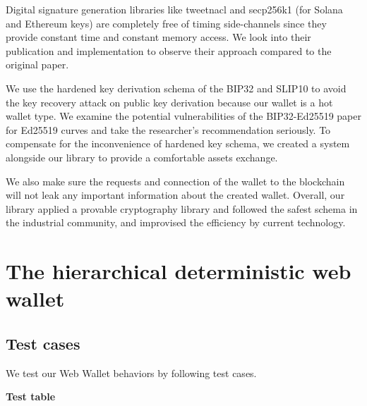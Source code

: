Digital signature generation libraries like tweetnacl and secp256k1 (for Solana and Ethereum keys) are completely free of timing side-channels since they provide constant time and constant memory access. We look into their publication and implementation to observe their approach compared to the original paper.

We use the hardened key derivation schema of the BIP32 and SLIP10 to avoid the key recovery attack on public key derivation because our wallet is a hot wallet type. We examine the potential vulnerabilities of the BIP32-Ed25519 paper for Ed25519 curves and take the researcher's recommendation seriously. To compensate for the inconvenience of hardened key schema, we created a system alongside our library to provide a comfortable assets exchange.

We also make sure the requests and connection of the wallet to the blockchain will not leak any important information about the created wallet. Overall, our library applied a provable cryptography library and followed the safest schema in the industrial community, and improvised the efficiency by current technology.

\section{The hierarchical deterministic web wallet}
\label{testhd}
\subsection{Test cases}
We test our Web Wallet behaviors by following test cases.

{\textbf{Test table}}

